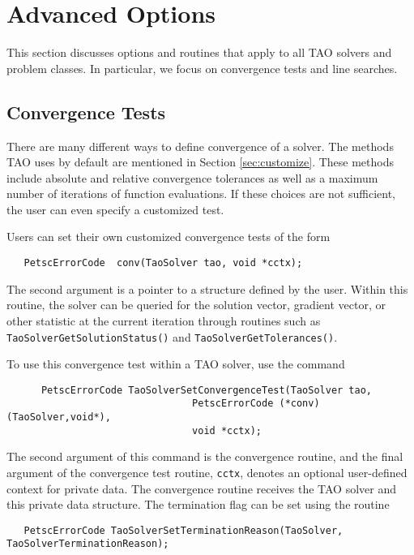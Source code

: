 
\chapter{Advanced Options}

This section discusses options and routines that apply to all TAO
solvers and problem classes.  In particular, we focus on
convergence tests and line searches.



\section{Convergence Tests}
\label{sec:Taoconvergence}

There are many different ways to define convergence of a solver.
The methods TAO uses by default are mentioned in 
Section \ref{sec:customize}.
These methods include absolute and relative convergence tolerances as well
as a maximum number of iterations of function evaluations.
If these choices are not sufficient, 
the user can even specify a customized test. 

Users can set their own customized convergence tests of the form
\begin{verbatim}
   PetscErrorCode  conv(TaoSolver tao, void *cctx);
\end{verbatim}
\noindent
The second argument
is a pointer to a structure defined by the user.
Within this routine, the solver
can be queried for the solution vector, gradient vector,
or other statistic at the current iteration through routines such as
{\tt TaoSolverGetSolutionStatus()} and  {\tt TaoSolverGetTolerances()}.

To use this convergence test within a TAO solver, use
the command 
\begin{verbatim}
      PetscErrorCode TaoSolverSetConvergenceTest(TaoSolver tao,
                                PetscErrorCode (*conv)(TaoSolver,void*),
                                void *cctx);
\end{verbatim}
\noindent
The second argument of this command is the convergence routine, and the
final argument of the convergence test routine, {\tt cctx},
denotes an optional user-defined context for private data.  
The convergence routine receives the TAO solver and this private data
structure. 
The termination flag can be set using the routine
\begin{verbatim}
   PetscErrorCode TaoSolverSetTerminationReason(TaoSolver, TaoSolverTerminationReason);
\end{verbatim}
\noindent



